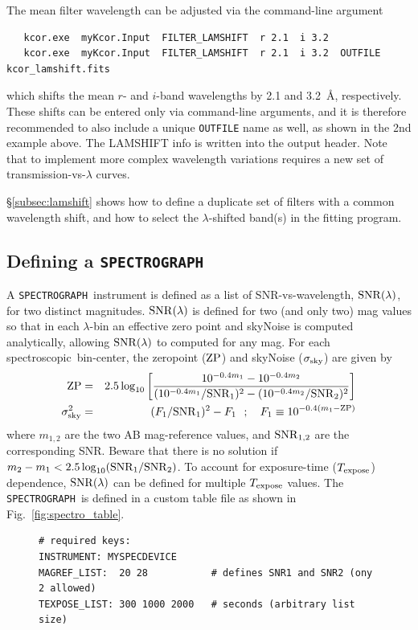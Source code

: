\documentclass[12pt]{article}
\newcommand{\SPEC}{{\tt SPECTROGRAPH}}
\newcommand{\SNRlam}{{\rm SNR}(\lambda)}
\newcommand{\Texpose}{T_{\rm expose}}
\newcommand{\ZP}{{\rm ZP}}
\newcommand{\sigSky}{\sigma_{\rm sky}}
\newcommand{\spec}{spectroscopic}
\newcommand{\lam}{\lambda}
\begin{document}
{The mean filter wavelength can be adjusted via the command-line
argument
\begin{verbatim}
   kcor.exe  myKcor.Input  FILTER_LAMSHIFT  r 2.1  i 3.2
   kcor.exe  myKcor.Input  FILTER_LAMSHIFT  r 2.1  i 3.2  OUTFILE kcor_lamshift.fits
\end{verbatim}
which shifts the mean $r$- and $i$-band  wavelengths
by 2.1 and 3.2~\AA, respectively. These shifts can be entered
only via command-line arguments, and it is therefore recommended
to also include a unique {\tt OUTFILE} name as well, as shown
in the 2nd example above. The LAMSHIFT info is written into
the output header. Note that to implement more complex wavelength
variations requires a new set of 
transmission-vs-$\lam$ curves.


\S\ref{subsec:lamshift} shows how to define a duplicate set
of filters with a common wavelength shift, and how to select
the $\lambda$-shifted band(s) in the fitting program.


 \clearpage
\subsection{Defining a {\SPEC} }
\label{subsec:kcor_spectrograph}


A \SPEC\ instrument is defined as a list of SNR-vs-wavelength,
$\SNRlam$, for two distinct magnitudes. 
$\SNRlam$ is defined for two (and only two) mag values so that in each
$\lam$-bin an effective zero point and skyNoise is 
computed analytically, allowing $\SNRlam$ to computed for any mag.
For each \spec\ bin-center, the zeropoint ($\ZP$) and skyNoise ($\sigSky$) 
are given by
%
\begin{eqnarray}
   \ZP & = &
      2.5\log_{10}\left[ \frac{  10^{-0.4m_1} - 10^{-0.4m_2} }
           {  (10^{-0.4m_1}/{\rm SNR}_1)^2 - (10^{-0.4m_2}/{\rm SNR}_2)^2 }
      \right]
     \\
   \sigSky^2 & = & (F_1/{\rm SNR}_1)^2 - F_1 ~~ ; ~~~ 
            F_1 \equiv 10^{-0.4(m_1-\ZP)}
  \label{eq:ZPspec}
\end{eqnarray}
%
where $m_{1,2}$ are the two AB mag-reference values,
and ${\rm SNR}_{1,2}$ are the corresponding SNR.
Beware that there is no solution if
$m_2-m_1 < 2.5\log_{10}({\rm SNR}_1/{\rm SNR}_2)$.
%
To account for exposure-time ($\Texpose$) dependence, 
$\SNRlam$ can be defined for multiple $\Texpose$ values.
The \SPEC\ is defined in a custom table file as shown 
in Fig.~\ref{fig:spectro_table}.
%
\begin{figure} [ht] 
\begin{center}
\begin{Verbatim}[frame=single]
# required keys:
INSTRUMENT: MYSPECDEVICE
MAGREF_LIST:  20 28           # defines SNR1 and SNR2 (ony 2 allowed)
TEXPOSE_LIST: 300 1000 2000   # seconds (arbitrary list size)


\end{Verbatim}
\end{center}
\end{figure}}
\end{document}
